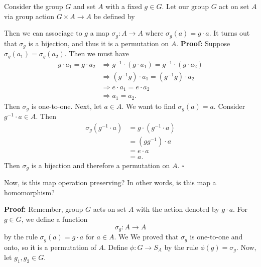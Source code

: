 \documentclass{article}
\begin{document}
Consider the group $G$ and set $A$ with a fixed $g \in G$. Let our group $G$ act on set $A$ via group action $G \times A \longrightarrow A$ 
be defined by 
\begin{center}
\end{center}

Then we can associage to $g$ a map $\sigma_g: A \longrightarrow A$ where $\sigma_g(a) = g \cdot a$. It turns out that $\sigma_g$ is a 
bijection, and thus it is a permutation on $A$.
\textbf{Proof:} Suppose $\sigma_g(a_1) = \sigma_g(a_2)$. Then we must have
\begin{align*}
    g \cdot a_1 = g \cdot a_2 &\Longrightarrow g^{-1} \cdot (g \cdot a_1) = g^{-1} \cdot(g \cdot a_2) \\
    &\Longrightarrow (g^{-1} g) \cdot a_1 = (g^{-1}g) \cdot a_2 \\
    &\Longrightarrow e \cdot a_1 = e \cdot a_2 \\
    &\Longrightarrow a_1 = a_2.
\end{align*}
Then $\sigma_g$ is one-to-one. Next, let $a \in A$. We want to find $\sigma_g(a)=a$. Consider $g^{-1} \cdot a \in A$. Then
\begin{align*}
    \sigma_g(g^{-1} \cdot a) &= g \cdot (g^{-1} \cdot a) \\
    &= (gg^{-1}) \cdot a \\
    &= e \cdot a \\
    &= a.
\end{align*}
Then $\sigma_g$ is a bijection and therefore a permutation on $A$. $\square$

Now, is this map operation preserving? In other words, is this map a homomorphism?

\textbf{Proof:} Remember, group $G$ acts on set $A$ with the action denoted by $g \cdot a$. For $g \in G$, we define a function
\[
    \sigma_g:A \longrightarrow A
\]
by the rule $\sigma_g(a)=g \cdot a$ for $a \in A$. We We proved that $\sigma_g$ is one-to-one and onto, so it is a permutation of $A$.
Define $\phi: G \longrightarrow S_A$ by the rule $\phi(g) = \sigma_g$. Now, let $g_1,g_2 \in G$. 
\end{document}
